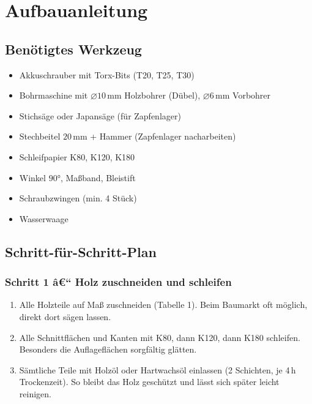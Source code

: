 ﻿\documentclass[12pt,a4paper]{article}
\theoremstyle{definition}
\theoremstyle{plain}
\theoremstyle{remark}
\begin{document}
\section{Aufbauanleitung}

\subsection{Benötigtes Werkzeug}

\begin{itemize}[nosep]
  \item Akkuschrauber mit Torx-Bits (T20, T25, T30)
  \item Bohrmaschine mit $\varnothing 10\,\text{mm}$ Holzbohrer (Dübel), $\varnothing 6\,\text{mm}$ Vorbohrer
  \item Stichsäge oder Japansäge (für Zapfenlager)
  \item Stechbeitel $20\,\text{mm}$ + Hammer (Zapfenlager nacharbeiten)
  \item Schleifpapier K80, K120, K180
  \item Winkel $90 °$, Maßband, Bleistift
  \item Schraubzwingen (min. 4 Stück)
  \item Wasserwaage
\end{itemize}

\subsection{Schritt-für-Schritt-Plan}

\subsubsection*{Schritt 1 â€“ Holz zuschneiden und schleifen}

\begin{enumerate}
  \item Alle Holzteile auf Maß zuschneiden (Tabelle 1). Beim Baumarkt
        oft möglich, direkt dort sägen lassen.
  \item Alle Schnittflächen und Kanten mit K80, dann K120, dann K180
        schleifen. Besonders die Auflageflächen sorgfältig glätten.
  \item Sämtliche Teile mit Holzöl oder Hartwachsöl einlassen
        (2 Schichten, je 4\,h Trockenzeit). So bleibt das Holz geschützt
        und lässt sich später leicht reinigen.
\end{enumerate}
\end{document}
